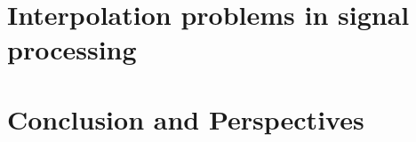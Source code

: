 \documentclass[twoside,11pt]{book}
\numberwithin{theorem}{chapter}
\numberwithin{definition}{chapter}
\numberwithin{proposition}{chapter}
\numberwithin{corollary}{chapter}
\numberwithin{example}{chapter}
\numberwithin{lemma}{chapter}
\numberwithin{assumption}{chapter}
\DeclareMathOperator{\VS}{\mathrm{VS}}
\DeclareMathOperator{\EX}{\mathbb{E}}
\DeclareMathOperator{\F}{\mathcal{F}}
\begin{document}








\clearpage

\chapter{Interpolation problems in signal processing}\label{chapter:signal_reconstruction}


\chapter{Conclusion and Perspectives}

\paragraph{\Large\selectfont{Conclusion}}

\paragraph{\Large\selectfont{Perspectives}}
\end{document}
